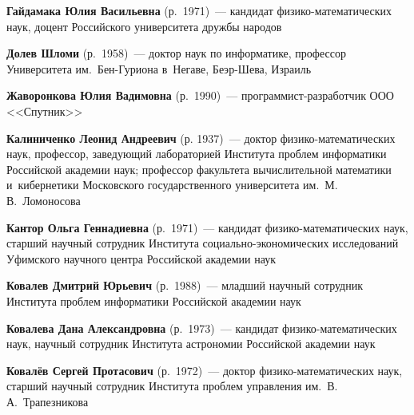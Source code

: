 \begin{multicols}{2}

\noindent
\textbf{Гайдамака Юлия Васильевна} (р.\ 1971)~---
кандидат фи\-зи\-ко-ма\-те\-ма\-ти\-че\-ских наук, доцент Российского университета
дружбы народов

\vspace*{1pt}


\noindent
\textbf{Долев Шломи} (р.\ 1958)~--- доктор наук по информатике, профессор
Университета им.\ Бен-Гуриона в~Негаве, Беэр-Шева, Израиль

\vspace*{1pt}



\noindent
\textbf{Жаворонкова Юлия Вадимовна} (р.\ 1990)~---
про\-грам\-мист-раз\-ра\-бот\-чик ООО <<Спутник>>

\vspace*{1pt}



\noindent
\textbf{Калиниченко Леонид Андреевич} (р. 1937)~---
доктор фи\-зи\-ко-ма\-те\-ма\-ти\-че\-ских наук, профессор, заведующий лабораторией
Института проб\-лем информатики Российской академии наук;
профессор факульте\-та вычислительной математики и~кибернетики
Московского государственного университета им.\ М.\,В.~Ломоносова

\vspace*{1pt}

\noindent
\textbf{Кантор Ольга Геннадиевна} (р.\ 1971)~---
кандидат фи\-зи\-ко-ма\-те\-ма\-ти\-че\-ских наук, старший научный сотрудник
Института со\-ци\-а\-ль\-но-эко\-но\-ми\-че\-ских исследова\-ний Уфимского
научного центра Российской академии наук

\vspace*{1pt}


\noindent
\textbf{Ковалев Дмитрий Юрьевич} (р.\ 1988)~---
младший научный сотрудник Института проблем информатики Российской академии наук

\vspace*{1pt}

\noindent
\textbf{Ковалева Дана Александровна} (р.\ 1973)~---
кандидат фи\-зи\-ко-ма\-те\-ма\-ти\-че\-ских наук, научный сотрудник Института
астрономии Российской академии наук

\vspace*{1pt}


\noindent
\textbf{Ковалёв Сергей Протасович}  (р.\ 1972)~---
доктор фи\-зи\-ко-ма\-те\-ма\-ти\-че\-ских наук,
старший научный сотрудник Института проблем управления им.\ В.\,А.~Трапезникова


\end{multicols}
